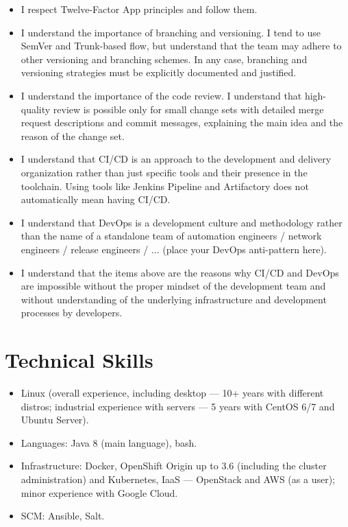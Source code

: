 \documentclass[letterpaper, 11pt]{article}
\begin{document}
    \begin{itemize}
        \item I respect Twelve-Factor App principles and follow them.
        \item I understand the importance of branching and versioning. I tend to use SemVer and Trunk-based flow, but understand that the team may adhere to other versioning and branching schemes. In any case, branching and versioning strategies must be explicitly documented and justified.
        \item I understand the importance of the code review. I understand that high-quality review is possible only for small change sets with detailed merge request descriptions and commit messages, explaining the main idea and the reason of the change set.
        \item I understand that CI/CD is an approach to the development and delivery organization rather than just specific tools and their presence in the toolchain. Using tools like Jenkins Pipeline and Artifactory does not automatically mean having CI/CD.
        \item I understand that DevOps is a development culture and methodology rather than the name of a standalone team of automation engineers / network engineers / release engineers / ... (place your DevOps anti-pattern here).
        \item I understand that the items above are the reasons why CI/CD and DevOps are impossible without the proper mindset of the development team and without understanding of the underlying infrastructure and development processes by developers.
    \end{itemize}
    
    \renewcommand{\labelitemi}{\textbullet}





    \section{Technical Skills}

    \begin{itemize}
        \item Linux (overall experience, including desktop --- 10+ years with different distros; industrial experience with servers --- 5 years with CentOS 6/7 and Ubuntu Server).
        \item Languages: Java 8 (main language), bash.
        \item Infrastructure: Docker, OpenShift Origin up to 3.6 (including the cluster administration) and Kubernetes, IaaS --- OpenStack and AWS (as a user); minor experience with Google Cloud.
        \item SCM: Ansible, Salt.
    \end{itemize}
\end{document}
